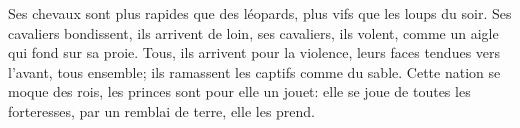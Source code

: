 Ses chevaux sont plus rapides que des léopards, plus vifs que les loups du soir.
Ses cavaliers bondissent, ils arrivent de loin,
	ses cavaliers, ils volent, comme un aigle qui fond sur sa proie.
Tous, ils arrivent pour la violence, leurs faces tendues vers l’avant, tous ensemble;
	ils ramassent les captifs comme du sable.
Cette nation se moque des rois, les princes sont pour elle un jouet:
	elle se joue de toutes les forteresses, par un remblai de terre, elle les prend.
